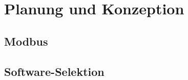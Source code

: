 \ifoot{\schneider}
\chapter{Planung und Konzeption}

\section{Modbus}


\newpage
\ifoot{\schneider}
\section{Software-Selektion}


\newpage
\ifoot{\pezze}

